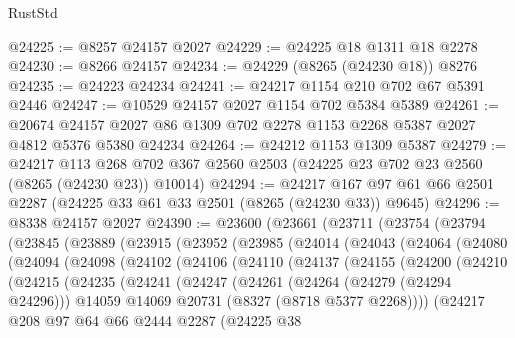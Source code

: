 \begin{lexlean}{RustStd}
\begin{coremodule}
{\begin{coremodule}
{{{{{{{{{{{{{{{{{{{{{{{{{{{{{{{{{{{{{{{{{{{{{{{{{{{{{{@24225 := @8257 @24157 @2027
@24229 := @24225 @18 @1311 @18 @2278
@24230 := @8266 @24157
@24234 := @24229 (@8265 (@24230 @18)) @8276
@24235 := @24223 @24234
@24241 := @24217 @1154 @210 @702 @67 @5391 @2446
@24247 := @10529 @24157 @2027 @1154 @702 @5384 @5389
@24261 := @20674 @24157 @2027 @86 @1309 @702 @2278 @1153 @2268 @5387 @2027 @4812 @5376 @5380 @24234
@24264 := @24212 @1153 @1309 @5387
@24279 := @24217
    @113
    @268
    @702
    @367
    @2560
    @2503
    (@24225 @23 @702 @23 @2560 (@8265 (@24230 @23)) @10014)
@24294 := @24217 @167 @97 @61 @66 @2501 @2287 (@24225 @33 @61 @33 @2501 (@8265 (@24230 @33)) @9645)
@24296 := @8338 @24157 @2027
@24390 := @23600
    (@23661
      (@23711
        (@23754
          (@23794
            (@23845
              (@23889
                (@23915
                  (@23952
                    (@23985
                      (@24014
                        (@24043
                          (@24064
                            (@24080
                              (@24094
                                (@24098
                                  (@24102
                                    (@24106
                                      (@24110
                                        (@24137
                                          (@24155
                                            (@24200
                                              (@24210
                                                (@24215
                                                  (@24235
                                                    (@24241
                                                      (@24247
                                                        (@24261
                                                          (@24264 (@24279 (@24294 @24296)))
                                                          @14059
                                                          @14069
                                                          @20731
                                                          (@8327 (@8718 @5377 @2268))))
                                                      (@24217
                                                        @208
                                                        @97
                                                        @64
                                                        @66
                                                        @2444
                                                        @2287
                                                        (@24225
                                                          @38
}}}}}}}}}}}}}}}}}}}}}}}}}}}}}}}}}}}}}}}}}}}}}}}}}}}}}}
\end{coremodule}}
\end{coremodule}
\end{lexlean}
